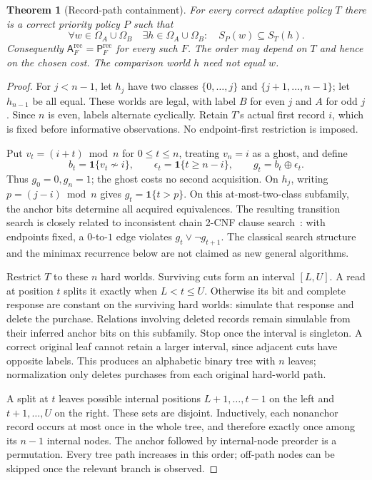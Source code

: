 \documentclass[pdflatex,sn-mathphys-num]{sn-jnl}
\newcommand{\A}{\mathsf{A}}
\newcommand{\Pcost}{\mathsf{P}}
\theoremstyle{thmstyleone}
\newtheorem{theorem}{Theorem}
\theoremstyle{thmstylethree}
\theoremstyle{thmstyletwo}
\begin{document}
\begin{theorem}[Record-path containment]\label{thm:record-path}
For every correct adaptive policy $T$ there is a correct priority policy $P$ such that
\[
 \forall w\in\Omega_A\cup\Omega_B\quad
 \exists h\in\Omega_A\cup\Omega_B:
 \quad S_P(w)\subseteq S_T(h).
\]
Consequently $\A_F^{\mathrm{rec}}=\Pcost_F^{\mathrm{rec}}$ for every such $F$. The order may depend on $T$ and hence on the chosen cost. The comparison world $h$ need not equal $w$.
\end{theorem}
\begin{proof}
For $j<n-1$, let $h_j$ have two classes $\{0,\ldots,j\}$ and $\{j+1,\ldots,n-1\}$; let $h_{n-1}$ be all equal. These worlds are legal, with label $B$ for even $j$ and $A$ for odd $j$. Since $n$ is even, labels alternate cyclically. Retain $T$'s actual first record $i$, which is fixed before informative observations. No endpoint-first restriction is imposed.

Put $v_t=(i+t)\bmod n$ for $0\leq t\leq n$, treating $v_n=i$ as a ghost, and define
\[
 b_t=\mathbf1\{v_t\not\sim i\},\qquad
 \epsilon_t=\mathbf1\{t\geq n-i\},\qquad
 g_t=b_t\oplus\epsilon_t.
\]
Thus $g_0=0,g_n=1$; the ghost costs no second acquisition. On $h_j$, writing $p=(j-i)\bmod n$ gives $g_t=\mathbf1\{t>p\}$. On this at-most-two-class subfamily, the anchor bits determine all acquired equivalences. The resulting transition search is closely related to inconsistent chain 2-CNF clause search~\cite[Section~4]{lovasz}: with endpoints fixed, a $0$-to-$1$ edge violates $g_t\lor\neg g_{t+1}$. The classical search structure and the minimax recurrence below are not claimed as new general algorithms.

Restrict $T$ to these $n$ hard worlds. Surviving cuts form an interval $[L,U]$. A read at position $t$ splits it exactly when $L<t\leq U$. Otherwise its bit and complete response are constant on the surviving hard worlds: simulate that response and delete the purchase. Relations involving deleted records remain simulable from their inferred anchor bits on this subfamily. Stop once the interval is singleton. A correct original leaf cannot retain a larger interval, since adjacent cuts have opposite labels. This produces an alphabetic binary tree with $n$ leaves; normalization only deletes purchases from each original hard-world path.

A split at $t$ leaves possible internal positions $L+1,\ldots,t-1$ on the left and $t+1,\ldots,U$ on the right. These sets are disjoint. Inductively, each nonanchor record occurs at most once in the whole tree, and therefore exactly once among its $n-1$ internal nodes. The anchor followed by internal-node preorder is a permutation. Every tree path increases in this order; off-path nodes can be skipped once the relevant branch is observed.


\end{proof}
\end{document}
